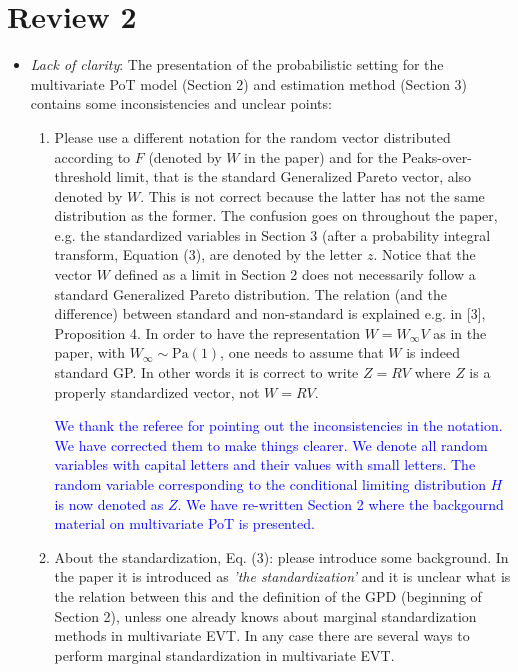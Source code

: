 \documentclass[10pt]{article}
\newcommand{\response}[1]{\textcolor{blue}{#1}}
\begin{document}
\section*{Review 2}
\begin{itemize}
\item \emph{Lack of clarity}: The presentation of the probabilistic setting for the multivariate 
    PoT model (Section 2) and estimation method (Section 3) contains some inconsistencies and unclear
    points:
    \begin{enumerate}
    \item Please use a different notation for the random vector distributed according to $F$ 
        (denoted by $W$ in the paper) and for the Peaks-over-threshold limit, that is the standard
        Generalized Pareto vector, also denoted by $W$. This is not correct because the latter has 
        not the same distribution as the former. The confusion goes on throughout the paper, e.g. 
        the standardized variables in Section 3 (after a probability integral transform, Equation
        (3), are denoted by the letter $z$. Notice that the vector $W$ defined as a limit in Section 
        2 does not necessarily follow a standard Generalized Pareto distribution. The relation 
        (and the difference) between standard and non-standard is explained e.g. in [3], Proposition 4. 
        In order to have the representation $W = W_{\infty}V$ as in the paper, with 
        $W_{\infty} \sim \text{Pa}(1)$, one needs to assume that $W$ is indeed standard GP. In other 
        words it is correct to write $Z = RV$ where $Z$ is a properly standardized vector, not $W = RV$.
        
\response{We thank the referee for pointing out the inconsistencies in the notation. We have corrected them 
        to make things clearer. We denote all random variables with capital letters and their values
        with small letters. The random variable corresponding to the conditional limiting distribution
        $H$ is now denoted as $Z$. We have re-written Section 2 where the backgournd material on multivariate
        PoT is presented.
        }

    \item About the standardization, Eq. (3): please introduce some background. In the paper it is
        introduced as \emph{’the standardization’} and it is unclear what is the relation between this 
        and the definition of the GPD (beginning of Section 2), unless one already knows about marginal
        standardization methods in multivariate EVT. In any case there are several ways to perform 
        marginal standardization in multivariate EVT.


\end{enumerate}
\end{itemize}
\end{document}
